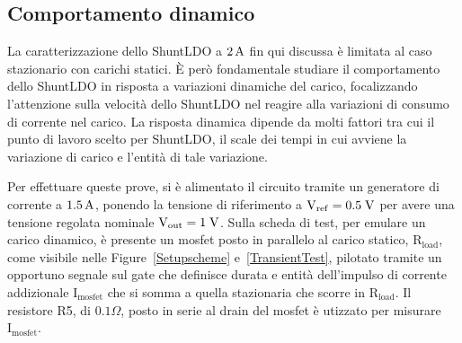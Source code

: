 \subsection{Comportamento dinamico}

La caratterizzazione dello ShuntLDO a $2 \rm \, A$ fin qui discussa \`e limitata al caso stazionario con carichi statici.
\`E per\`o fondamentale studiare il comportamento dello ShuntLDO in risposta a variazioni dinamiche del carico, focalizzando l'attenzione sulla velocità dello ShuntLDO nel reagire alla variazioni di consumo di corrente nel carico. 
La risposta dinamica dipende da molti fattori tra cui il punto di lavoro scelto per ShuntLDO, il scale dei tempi in cui avviene la variazione di carico e l'entità di tale variazione.

Per effettuare queste prove, si è alimentato il circuito tramite un generatore di corrente a $1.5\rm \, A$, ponendo la tensione di riferimento a $\mathrm{V_{ref}=0.5 \rm \; V}$ per avere una tensione regolata nominale $\mathrm{V_{out}}=1\rm \; V$. %
Sulla scheda di test, per emulare un carico dinamico, è presente un mosfet posto in parallelo al carico statico, $\mathrm{R_{load}}$, come visibile nelle Figure~\ref{Setupscheme} e~\ref{TransientTest}, pilotato tramite un opportuno segnale sul gate che definisce durata e entit\`a dell'impulso di corrente addizionale $\mathrm{I_{mosfet}}$ che si somma a quella stazionaria che scorre in $\mathrm{R_{load}}$. Il resistore R5, di $0.1 \Omega$, posto in serie al drain del mosfet \`e utizzato per misurare $\mathrm{I_{mosfet}}$.

